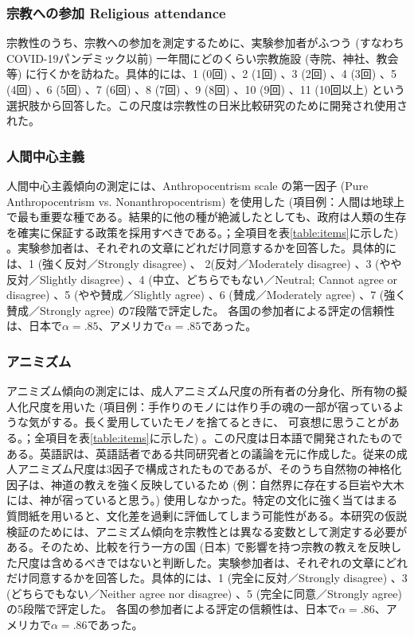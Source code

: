\documentclass[a4j,12pt]{jreport}
\begin{document}
\subsubsection*{宗教への参加 Religious attendance}
宗教性のうち、宗教への参加を測定するために、実験参加者がふつう (すなわちCOVID-19パンデミック以前) 一年間にどのくらい宗教施設 (寺院、神社、教会等) に行くかを訪ねた。具体的には、1 (0回) 、2 (1回) 、3 (2回) 、4 (3回) 、5 (4回) 、6 (5回) 、7 (6回) 、8 (7回) 、9 (8回) 、10 (9回) 、11 (10回以上) という選択肢から回答した。この尺度は宗教性の日米比較研究\cite{kava}のために開発され使用された。


\subsubsection*{人間中心主義}
人間中心主義傾向の測定には、Anthropocentrism scale \cite{chand}の第一因子 (Pure Anthropocentrism vs. Nonanthropocentrism) を使用した (項目例：人間は地球上で最も重要な種である。結果的に他の種が絶滅したとしても、政府は人類の生存を確実に保証する政策を採用すべきである。；全項目を表\ref{table:items}に示した) 。実験参加者は、それぞれの文章にどれだけ同意するかを回答した。具体的には、1 (強く反対／Strongly disagree) 、 2(反対／Moderately disagree) 、3 (やや反対／Slightly disagree) 、4 (中立、どちらでもない／Neutral; Cannot agree or disagree) 、5 (やや賛成／Slightly agree) 、6 (賛成／Moderately agree) 、7 (強く賛成／Strongly agree) の7段階で評定した。
各国の参加者による評定の信頼性は、日本で$\alpha=.85$、アメリカで$\alpha=.85$であった。


\subsubsection*{アニミズム}
アニミズム傾向の測定には、成人アニミズム尺度\cite{ikeuchi}の所有者の分身化、所有物の擬人化尺度を用いた (項目例：手作りのモノには作り手の魂の一部が宿っているような気がする。長く愛用していたモノを捨てるときに、 可哀想に思うことがある。；全項目を表\ref{table:items}に示した) 。この尺度は日本語で開発されたものである。英語訳は、英語話者である共同研究者との議論を元に作成した。従来の成人アニミズム尺度は3因子で構成されたものであるが、そのうち自然物の神格化因子は、神道の教えを強く反映しているため (例：自然界に存在する巨岩や大木には、神が宿っていると思う。) 使用しなかった。特定の文化に強く当てはまる質問紙を用いると、文化差を過剰に評価してしまう可能性がある。本研究の仮説検証のためには、アニミズム傾向を宗教性とは異なる変数として測定する必要がある。そのため、比較を行う一方の国 (日本) で影響を持つ宗教の教えを反映した尺度は含めるべきではないと判断した。実験参加者は、それぞれの文章にどれだけ同意するかを回答した。具体的には、1 (完全に反対／Strongly disagree) 、3 (どちらでもない／Neither agree nor disagree) 、5 (完全に同意／Strongly agree) の5段階で評定した。
各国の参加者による評定の信頼性は、日本で$\alpha=.86$、アメリカで$\alpha=.86$であった。
\end{document}
